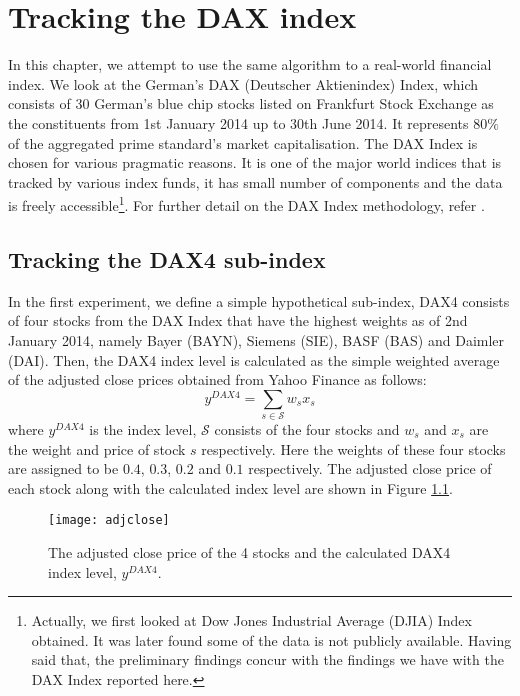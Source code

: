 \chapter{Tracking the DAX index}
\graphicspath{{Chapter4/figures/}}
\label{cha:dax}
In this chapter, we attempt to use the same algorithm to a real-world financial index. We look at the German's DAX (Deutscher Aktienindex) Index, which consists of 30 German's blue chip stocks listed on Frankfurt Stock Exchange as the constituents from 1st January 2014 up to 30th June 2014. It represents $80\%$ of the aggregated prime standard's market capitalisation. The DAX Index is chosen for various pragmatic reasons. It is one of the major world indices that is tracked by various index funds, it has small number of components and the data is freely accessible\footnote{Actually, we first looked at Dow Jones Industrial Average (DJIA) Index obtained. It was later found some of the data is not publicly available. Having said that, the preliminary findings concur with the findings we have with the DAX Index reported here.}. For further detail on the DAX Index methodology, refer \cite{DAX14}.
 
\section{Tracking the DAX4 sub-index}
In the first experiment, we define a simple hypothetical sub-index, DAX4 consists of four stocks from the DAX Index that have the highest weights as of 2nd January 2014, namely Bayer (BAYN), Siemens (SIE), BASF (BAS) and Daimler (DAI). Then, the DAX4 index level is calculated as the simple weighted average of the adjusted close prices obtained from Yahoo Finance as follows:
\begin{equation}
  y^{DAX4} = \sum_{s \in \mathcal{S}} w_s x_s
\end{equation}
where $y^{DAX4}$ is the index level, $\mathcal{S}$ consists of the four stocks and  $w_s$ and $x_s$ are the weight and price of stock $s$ respectively. Here the weights of these four stocks are assigned to be $0.4$, $0.3$, $0.2$ and $0.1$ respectively. The adjusted close price of each stock along with the calculated index level are shown in Figure \ref{fig:adjclose}.
 
\begin{figure}[!thbp]
\centering
\texttt{[image: adjclose]}
\caption{The adjusted close price of the 4 stocks and the calculated DAX4 index level, $y^{DAX4}$.}
\label{fig:adjclose}
\end{figure}
 
